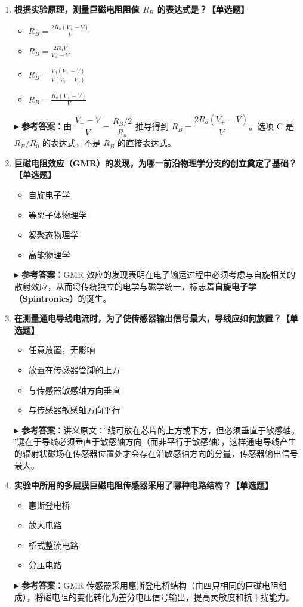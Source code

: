 \documentclass[12pt,a4paper]{article}
\newcommand{\answer}[1]{\vspace{2pt}\noindent\textbf{\color{teal!80!black}▸ 参考答案：}#1\vspace{4pt}}
\begin{document}
\begin{enumerate}[label=\arabic*.]
    \item \textbf{根据实验原理，测量巨磁电阻阻值 \(R_B\) 的表达式是？【单选题】}
    \begin{itemize}
        \item[\checkmark] \(\displaystyle R_B = \frac{2R_a(V_+ - V)}{V}\)
        \item \(\displaystyle R_B = \frac{2R_a V}{V_+ - V}\)
        \item \(\displaystyle R_B = \frac{V_0(V_+ - V)}{V(V_+ - V_0)}\)
        \item \(\displaystyle R_B = \frac{R_a(V_+ - V)}{V}\)
    \end{itemize}
    \answer{由 $\dfrac{V_+ - V}{V} = \dfrac{R_B/2}{R_a}$ 推导得到 $R_B = \dfrac{2R_a(V_+ - V)}{V}$。选项 C 是 $R_B/R_0$ 的表达式，不是 $R_B$ 的直接表达式。}

    \item \textbf{巨磁电阻效应（GMR）的发现，为哪一前沿物理学分支的创立奠定了基础？【单选题】}
    \begin{itemize}
        \item[\checkmark] 自旋电子学
        \item 等离子体物理学
        \item 凝聚态物理学
        \item 高能物理学
    \end{itemize}
    \answer{GMR 效应的发现表明在电子输运过程中必须考虑与自旋相关的散射效应，从而将传统独立的电学与磁学统一，标志着\textbf{自旋电子学（Spintronics）}的诞生。}

    \item \textbf{在测量通电导线电流时，为了使传感器输出信号最大，导线应如何放置？【单选题】}
    \begin{itemize}
        \item 任意放置，无影响
        \item 放置在传感器管脚的上方
        \item[\checkmark] 与传感器敏感轴方向垂直
        \item 与传感器敏感轴方向平行
    \end{itemize}
    \answer{讲义原文：\"导线可放在芯片的上方或下方，但必须垂直于敏感轴。\"关键在于导线必须垂直于敏感轴方向（而非平行于敏感轴），这样通电导线产生的辐射状磁场在传感器位置处才会存在沿敏感轴方向的分量，传感器输出信号最大。}

    \item \textbf{实验中所用的多层膜巨磁电阻传感器采用了哪种电路结构？【单选题】}
    \begin{itemize}
        \item[\checkmark] 惠斯登电桥
        \item 放大电路
        \item 桥式整流电路
        \item 分压电路
    \end{itemize}
    \answer{GMR 传感器采用惠斯登电桥结构（由四只相同的巨磁电阻组成），将磁电阻的变化转化为差分电压信号输出，提高灵敏度和抗干扰能力。}


\end{enumerate}
\end{document}
